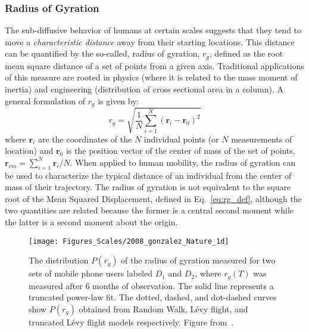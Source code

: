 %

\subsubsection{Radius of Gyration}\label{sec:rg}
The sub-diffusive behavior of humans at certain scales suggests that they tend to move a \emph{characteristic distance} away from their starting locations. This distance can be quantified by the so-called, radius of gyration, $r_g$, defined as the root mean square distance of a set of points from a given axis. Traditional applications of this measure are rooted in physics (where it is related to the mass moment of inertia) and engineering (distribution of cross sectional area in a column). A general formulation of $r_g$ is given by:
\begin{equation}\label{eq:rg_def}
 r_{g} = \sqrt{\frac{1}{N} \sum_{i=1}^{N}(\mathbf{r}_i - \mathbf{r}_0)^2}
\end{equation}
where $\mathbf{r}_i$ are the coordinates of the $N$ individual points (or $N$ measurements of location) and $\mathbf{r}_0$ is the position vector of the center of mass of the set of points, $\mathbf{r}_{cm} = \sum_{i=1}^{N} \mathbf{r}_i / N$. When applied to human mobility, the radius of gyration can be used to characterize the typical distance of an individual from the center of mass of their trajectory.
The radius of gyration is not equivalent to the square root of the Mean Squared Displacement, defined in Eq.~\ref{eq:rg_def}, although the two quantities are related because the former is a central second moment while the latter is a second moment about the origin. 
\begin{figure}[ht!]
\centering
\texttt{[image: Figures\_Scales/2008\_gonzalez\_Nature\_1d]}
\caption{The distribution $P(r_g)$ of the radius of gyration measured for two sets of mobile phone users labeled $D_1$ and $D_2$, where $r_g(T)$ was measured after 6 months of observation. The solid line represents a truncated power-law fit. The dotted, dashed, and dot-dashed curves show $P(r_g)$ obtained from Random Walk, L\'evy flight, and truncated L\'evy flight models respectively. Figure from~\cite{gonzalez_2008_understanding}.}
\label{fig:scales_gonzalez_1}
\end{figure}

